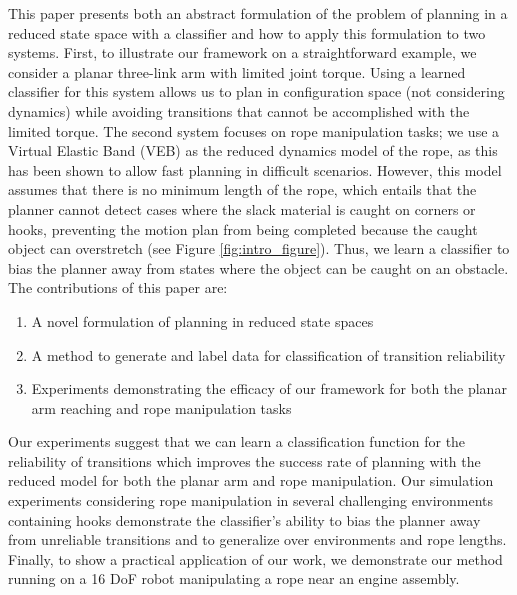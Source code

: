 This paper presents both an abstract formulation of the problem of planning in a reduced state space with a classifier and how to apply this formulation to two systems. First, to illustrate our framework on a straightforward example, we consider a planar three-link arm with limited joint torque. Using a learned classifier for this system allows us to plan in configuration space (not considering dynamics) while avoiding transitions that cannot be accomplished with the limited torque. The second system focuses on rope manipulation tasks; we use a Virtual Elastic Band (VEB) \cite{McConachie2017} as the reduced dynamics model of the rope, as this has been shown to allow fast planning in difficult scenarios. However, this model assumes that there is no minimum length of the rope, which entails that the planner cannot detect cases where the slack material is caught on corners or hooks, preventing the motion plan from being completed because the caught object can overstretch (see Figure \ref{fig:intro_figure}). Thus, we learn a classifier to bias the planner away from states where the object can be caught on an obstacle.
The contributions of this paper are:
\begin{enumerate}
    \item A novel formulation of planning in reduced state spaces
    \item A method to generate and label data for classification of transition reliability
    \item Experiments demonstrating the efficacy of our framework for both the planar arm reaching and rope manipulation tasks
\end{enumerate}

Our experiments suggest that we can learn a classification function for the reliability of transitions which improves the success rate of planning with the reduced model for both the planar arm and rope manipulation. Our simulation experiments considering rope manipulation in several challenging environments containing hooks demonstrate the classifier's ability to bias the planner away from unreliable transitions and to generalize over environments and rope lengths. %
Finally, to show a practical application of our work, we demonstrate our method running on a 16 DoF robot manipulating a rope near an engine assembly.


